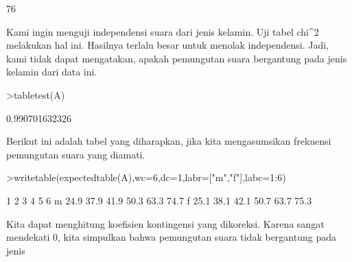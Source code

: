 \documentclass[a4paper,10pt]{article}
\begin{document}
\begin{eulernotebook}
\begin{eulercomment}
\begin{eulercomment}
\begin{eulercomment}
\begin{eulercomment}
\begin{eulercomment}
\begin{eulercomment}
\begin{eulercomment}
\begin{eulercomment}
\begin{eulercomment}
\begin{eulercomment}
\begin{eulercomment}
\begin{eulercomment}
\begin{eulercomment}
\begin{eulercomment}
\begin{eulercomment}
\begin{eulercomment}
\begin{eulercomment}
\begin{eulercomment}
\begin{eulercomment}
\begin{eulercomment}
\begin{eulercomment}
\begin{eulercomment}
\begin{eulercomment}
\begin{eulercomment}
\begin{eulercomment}
\begin{eulercomment}
\begin{eulercomment}
\begin{eulercomment}
\begin{eulercomment}
\begin{eulercomment}
\begin{eulercomment}
\begin{eulercomment}
\begin{eulercomment}
\begin{eulercomment}
\begin{eulercomment}
\begin{eulercomment}
\begin{eulercomment}
\begin{eulercomment}
\begin{eulercomment}
\begin{eulercomment}
\begin{eulercomment}
\begin{eulercomment}
\begin{eulercomment}
\begin{eulercomment}
\begin{eulercomment}
\begin{eulercomment}
\begin{eulercomment}
\begin{eulercomment}
\begin{eulercomment}
\begin{eulercomment}
\begin{eulercomment}
\begin{eulercomment}
\begin{eulercomment}
\begin{eulercomment}
\begin{eulercomment}
\begin{eulercomment}
\begin{eulercomment}
\begin{eulercomment}
\begin{eulercomment}
\begin{eulercomment}
\begin{eulercomment}
\begin{eulercomment}
\begin{eulercomment}
\begin{eulercomment}
\begin{eulercomment}
\begin{eulercomment}
\begin{euleroutput}
76
\end{euleroutput}
\begin{eulercomment}
Kami ingin menguji independensi suara dari jenis kelamin. Uji tabel
chi\textasciicircum{}2 melakukan hal ini. Hasilnya terlalu besar untuk menolak
independensi. Jadi, kami tidak dapat mengatakan, apakah pemungutan
suara bergantung pada jenis kelamin dari data ini.
\end{eulercomment}
\begin{eulerprompt}
>tabletest(A)
\end{eulerprompt}
\begin{euleroutput}
  0.990701632326
\end{euleroutput}
\begin{eulercomment}
Berikut ini adalah tabel yang diharapkan, jika kita mengasumsikan
frekuensi pemungutan suara yang diamati.
\end{eulercomment}
\begin{eulerprompt}
>writetable(expectedtable(A),wc=6,dc=1,labr=["m","f"],labc=1:6)
\end{eulerprompt}
\begin{euleroutput}
             1     2     3     4     5     6
       m  24.9  37.9  41.9  50.3  63.3  74.7
       f  25.1  38.1  42.1  50.7  63.7  75.3
\end{euleroutput}
\begin{eulercomment}
Kita dapat menghitung koefisien kontingensi yang dikoreksi. Karena
sangat mendekati 0, kita simpulkan bahwa pemungutan suara tidak
bergantung pada jenis 
\end{eulercomment}
\end{eulercomment}
\end{eulercomment}
\end{eulercomment}
\end{eulercomment}
\end{eulercomment}
\end{eulercomment}
\end{eulercomment}
\end{eulercomment}
\end{eulercomment}
\end{eulercomment}
\end{eulercomment}
\end{eulercomment}
\end{eulercomment}
\end{eulercomment}
\end{eulercomment}
\end{eulercomment}
\end{eulercomment}
\end{eulercomment}
\end{eulercomment}
\end{eulercomment}
\end{eulercomment}
\end{eulercomment}
\end{eulercomment}
\end{eulercomment}
\end{eulercomment}
\end{eulercomment}
\end{eulercomment}
\end{eulercomment}
\end{eulercomment}
\end{eulercomment}
\end{eulercomment}
\end{eulercomment}
\end{eulercomment}
\end{eulercomment}
\end{eulercomment}
\end{eulercomment}
\end{eulercomment}
\end{eulercomment}
\end{eulercomment}
\end{eulercomment}
\end{eulercomment}
\end{eulercomment}
\end{eulercomment}
\end{eulercomment}
\end{eulercomment}
\end{eulercomment}
\end{eulercomment}
\end{eulercomment}
\end{eulercomment}
\end{eulercomment}
\end{eulercomment}
\end{eulercomment}
\end{eulercomment}
\end{eulercomment}
\end{eulercomment}
\end{eulercomment}
\end{eulercomment}
\end{eulercomment}
\end{eulercomment}
\end{eulercomment}
\end{eulercomment}
\end{eulercomment}
\end{eulercomment}
\end{eulercomment}
\end{eulercomment}
\end{eulercomment}
\end{eulernotebook}
\end{document}
